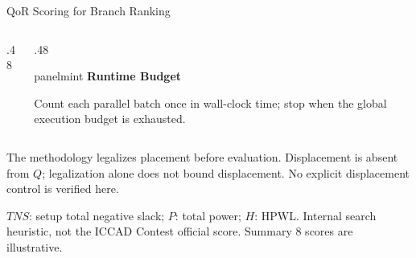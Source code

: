 \documentclass[aspectratio=169,10pt]{beamer}
\newcommand{\smallpanel}[3]{%
  \begin{beamercolorbox}[rounded=true,sep=0.13cm,wd=\linewidth]{#1}%
    {\small\bfseries\color{Accent}#2}\par\vspace{0.06cm}
    {\scriptsize\color{Ink}#3}%
  \end{beamercolorbox}%
}
\begin{document}
\begin{frame}[shrink=12,label=detail-quality]{QoR Scoring for Branch Ranking}
\begin{columns}[T,onlytextwidth]
\begin{column}{.48\textwidth}
    \end{column}
    \begin{column}{.48\textwidth}
      \smallpanel{panelmint}{Runtime Budget}{Count each parallel batch once in wall-clock time; stop when the global execution budget is exhausted.}
    \end{column}
  \end{columns}
  \vspace{.14cm}
  {\scriptsize The methodology legalizes placement before evaluation. Displacement is absent from $Q$; legalization alone does not bound displacement. No explicit displacement control is verified here.}\par\vspace{.09cm}
  {\scriptsize\color{Muted}$TNS$: setup total negative slack; $P$: total power; $H$: HPWL. Internal search heuristic, not the ICCAD Contest official score. Summary 8 scores are illustrative.}

\end{frame}
\end{document}
